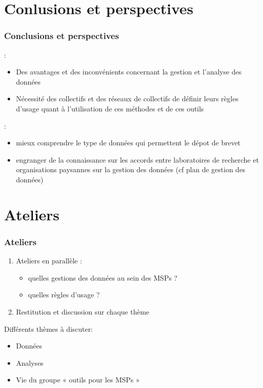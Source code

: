 \section{Conlusions et perspectives} \begin{frame}\small\tableofcontents[currentsection,currentsubsection,subsectionstyle=show/show/hide]\end{frame}

\begin{frame}
\frametitle{Conclusions et perspectives}

:
\begin{itemize}
\item Des avantages et des inconvénients concernant la gestion et l'analyse des données
\item Nécessité des collectifs et des réseaux de collectifs de définir leurs règles d'usage quant à l'utilisation de ces méthodes et de ces outils
\end{itemize}

:
\begin{itemize}
\item mieux comprendre le type de données qui permettent le dépot de brevet
\item engranger de la connaissance sur les accords entre laboratoires de recherche et organisations paysannes sur la gestion des données (cf plan de gestion des données)
\end{itemize}

\end{frame}

\section{Ateliers} 

\begin{frame}
\frametitle{Ateliers}

\begin{enumerate}
\item Ateliers en parallèle : 
	\begin{itemize}
	\item quelles gestions des données au sein des MSPs ?
	\item quelles règles d'usage ?	
	\end{itemize}
\item Restitution et discussion sur chaque thème
\end{enumerate}

\vfill

Différents thèmes à discuter:

\begin{itemize}
\item Données
\item Analyses
\item Vie du groupe « outils pour les MSPs »
\end{itemize}

\end{frame}


